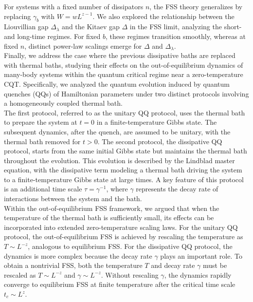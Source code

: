 {    For systems with a fixed number of dissipators \( n \), the FSS theory generalizes by replacing \( \gamma_b \) with \( W = wL^{z-1} \). We also explored the relationship between the Liouvillian gap \( \Delta_\lambda \) and the Kitaev gap \( \Delta \) in the FSS limit, analyzing the short- and long-time regimes. For fixed \( b \), these regimes transition smoothly, whereas at fixed \( n \), distinct power-law scalings emerge for \( \Delta \) and \( \Delta_\lambda \).
    \\$ $\\
    Finally, we address the case where the previous dissipative baths are replaced with thermal baths, studying their effects on the out-of-equilibrium dynamics of many-body systems within the quantum critical regime near a zero-temperature CQT.
    Specifically, we analyzed the quantum evolution induced by quantum quenches (QQs) of Hamiltonian parameters under two distinct protocols involving a homogeneously coupled thermal bath.\\
    The first protocol, referred to as the unitary QQ protocol, uses the thermal bath to prepare the system at \( t = 0 \) in a finite-temperature Gibbs state. The subsequent dynamics, after the quench, are assumed to be unitary, with the thermal bath removed for \( t > 0 \). The second protocol, the dissipative QQ protocol, starts from the same initial Gibbs state but maintains the thermal bath throughout the evolution. This evolution is described by the Lindblad master equation, with the dissipative term modeling a thermal bath driving the system to a finite-temperature Gibbs state at large times. A key feature of this protocol is an additional time scale \( \tau = \gamma^{-1} \), where \( \gamma \) represents the decay rate of interactions between the system and the bath.\\
    Within the out-of-equilibrium FSS framework, we argued that when the temperature of the thermal bath is sufficiently small, its effects can be incorporated into extended zero-temperature scaling laws. For the unitary QQ protocol, the out-of-equilibrium FSS is achieved by rescaling the temperature as \( T \sim L^{-z} \), analogous to equilibrium FSS. For the dissipative QQ protocol, the dynamics is more complex because the decay rate \( \gamma \) plays an important role. To obtain a nontrivial FSS, both the temperature \( T \) and decay rate \( \gamma \) must be rescaled as \( T \sim L^{-z} \) and \( \gamma \sim L^{-z} \). Without rescaling \( \gamma \), the dynamics rapidly converge to equilibrium FSS at finite temperature after the critical time scale \( t_c \sim L^z \).\\
}
